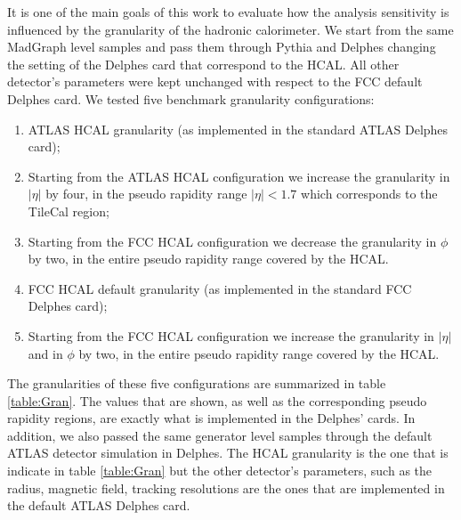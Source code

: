 It is one of the main goals of this work to evaluate how the analysis sensitivity is influenced by the granularity of the hadronic calorimeter. We start from the same MadGraph level samples and pass them through Pythia and Delphes changing the setting of the Delphes card that correspond to the HCAL. All other detector's parameters were kept unchanged with respect to the FCC default Delphes card. 
We tested five benchmark granularity configurations:

\begin{enumerate}
	\item ATLAS HCAL granularity (as implemented in the standard ATLAS Delphes card);
	\item Starting from the ATLAS HCAL configuration we increase the granularity in $|\eta|$ by four, in the pseudo rapidity range $|\eta|<1.7$ which corresponds to the TileCal region;
	\item Starting from the FCC HCAL configuration we decrease the granularity in $\phi$ by two, in the entire pseudo rapidity range covered by the HCAL.
	\item FCC HCAL default granularity (as implemented in the standard FCC Delphes card);
	\item Starting from the FCC HCAL configuration we increase the granularity in $|\eta|$ and in $\phi$ by two, in the entire pseudo rapidity range covered by the HCAL.
\end{enumerate}

The granularities of these five configurations are summarized in table \ref{table:Gran}. The values that are shown, as well as the corresponding pseudo rapidity regions, are exactly what is implemented in the Delphes' cards. In addition, we also passed the same generator level samples through the default ATLAS detector simulation in Delphes. The HCAL granularity is the one that is indicate in table \ref{table:Gran} but the other detector's parameters, such as the radius, magnetic field, tracking resolutions are the ones that are implemented in the default ATLAS Delphes card. 


